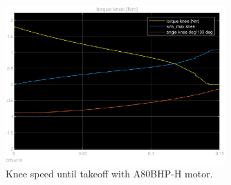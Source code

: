 

\begin{figure}[h]
    \centering
    \includegraphics[width=0.75\textwidth]{Images/joint_speed_A80BHM.eps}
    \caption{Knee speed until takeoff with A80BHP-H motor.}
    \label{fig:joint_speed_A80BHM}
\end{figure}

